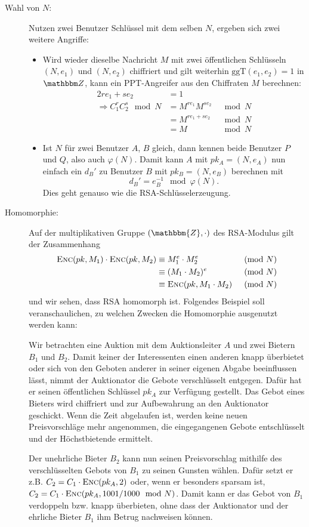 \begin{description}
\item[Wahl von $N$:] 
  Nutzen zwei Benutzer Schlüssel mit dem selben $N$, ergeben sich zwei
  weitere Angriffe:
  \begin{itemize}
  \item Wird wieder dieselbe Nachricht $M$ mit zwei
    öffentlichen Schlüsseln $(N, e_1)$ und $(N, e_2)$ chiffriert und
    gilt weiterhin $\text{ggT}(e_1, e_2) = 1$ in $\Z{}$, kann ein
    PPT-Angreifer aus den Chiffraten $M$ berechnen:
    \begin{alignat*}{2}
      re_1 + se_2 & = 1\\ 
      \Longrightarrow C_1^rC_2^s \mod N &= M^{re_1}M^{se_2} &\mod N\\
                  &= M^{re_1 + se_2} &\mod N\\
                  &= M &\mod N
    \end{alignat*}
  \item
    Ist $N$ für zwei Benutzer $A$, $B$ gleich, dann kennen beide Benutzer $P$ und
    $Q$, also auch $\varphi(N)$. Damit kann $A$ mit $pk_A = (N, e_A)$
    nun einfach ein $d_B'$ zu Benutzer $B$ mit $pk_B = (N, e_B)$
    berechnen mit 
    \[d_B'=e_B^{-1} \mod \varphi(N).\]
    Dies geht genauso wie die RSA-Schlüsselerzeugung.
  \end{itemize}    
\item[Homomorphie:] Auf der multiplikativen Gruppe $(\mathbbm{Z}, \cdot)$ des RSA-Modulus gilt der Zusammenhang
  \begin{alignat*}{2}
      \textsc{Enc}(pk, M_1) \cdot \textsc{Enc}(pk, M_2) &\equiv M_1^e \cdot M_2^e &
      \pmod N \\
      &\equiv (M_1 \cdot M_2)^e & \pmod N\\
      &\equiv \textsc{Enc}(pk, M_1 \cdot M_2) & \pmod N
  \end{alignat*}
  und wir sehen, dass RSA homomorph ist. 
  Folgendes Beispiel soll veranschaulichen, zu welchen Zwecken die Homomorphie ausgenutzt werden kann:   
    \begin{beispiel}
    	Wir betrachten eine Auktion mit dem Auktionsleiter $A$ und zwei Bietern $B_1$ und $B_2$. Damit keiner der Interessenten einen
    	anderen knapp überbietet oder sich von den Geboten anderer in seiner eigenen Abgabe beeinflussen lässt, nimmt der Auktionator die Gebote verschlüsselt entgegen. Dafür hat er seinen öffentlichen Schlüssel $pk_A$ zur Verfügung gestellt. Das Gebot eines Bieters wird chiffriert und zur Aufbewahrung an den Auktionator geschickt. Wenn die Zeit abgelaufen ist, werden keine neuen Preisvorschläge mehr angenommen, die eingegangenen Gebote entschlüsselt und der Höchstbietende ermittelt.
    
    	Der unehrliche Bieter $B_2$ kann nun seinen Preisvorschlag mithilfe des verschlüsselten Gebots von $B_1$ zu seinen Gunsten wählen. Dafür setzt er z.B. $C_2 =
    	C_1 \cdot \textsc{Enc}({pk_A, 2})$ oder, wenn er besonders sparsam ist, $C_2 = C_1 \cdot \textsc{Enc}({pk_A, 1001/1000 \mod N})$. Damit kann er das Gebot von $B_1$ verdoppeln
    	bzw. knapp überbieten, ohne dass der Auktionator und der ehrliche Bieter $B_1$ ihm Betrug nachweisen können.
    \end{beispiel}
\end{description} 

